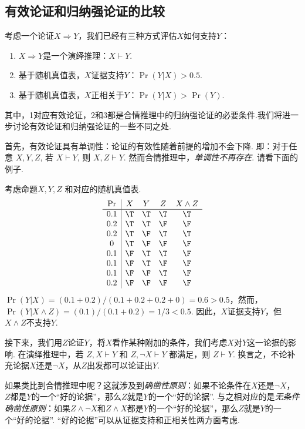 \subsection{有效论证和归纳强论证的比较}

考虑一个论证$X\Rightarrow Y$，我们已经有三种方式评估$X$如何支持$Y$：
    \begin{enumerate}
        \item $X\Rightarrow Y$是一个演绎推理：$X\vdash Y$.
        \item 基于随机真值表，$X$证据支持$Y$：$\Pr(Y|X) > 0.5$.
        \item 基于随机真值表，$X$正相关于$Y$：$\Pr(Y|X) > \Pr(Y)$.
    \end{enumerate}
其中，1对应有效论证，2和3都是合情推理中的归纳强论证的必要条件.我们将进一步讨论有效论证和归纳强论证的一些不同之处.

首先，有效论证具有单调性：论证的有效性随着前提的增加不会下降. 即：对于任意 $X, Y, Z$, 若 $X\vdash Y$, 则 $X,Z\vdash Y$. 然而合情推理中，\emph{单调性不再存在}. 请看下面的例子.

\begin{example}[非单调性：例子]
考虑命题$X, Y, Z$ 和对应的随机真值表.
\[\begin{array}{c|ccccc}
        \Pr & X & Y & Z & X \wedge Z \\ \hline
        0.1 & \T & \T & \T & \T\\
        0.2 & \T & \T & \F & \F\\
        0.2 & \T & \F & \T & \T\\
        0 & \T & \F & \F & \F\\ 
        0.1 & \F & \T & \T & \F\\ 
        0.1 & \F & \T & \F & \F\\
        0.1 & \F & \F & \T & \F\\
        0.2 & \F & \F & \F & \F\\
\end{array}\]
$\Pr(Y|X) = (0.1 + 0.2) / (0.1 + 0.2 + 0.2 + 0) = 0.6 > 0.5$，然而，$\Pr(Y|X \wedge Z) = (0.1) / (0.1 + 0.2) = 1/3 < 0.5$. 因此，$X$证据支持$Y$，但$X\wedge Z$不支持$Y$.
\end{example}

接下来，我们用$Z$论证$Y$，将$X$看作某种附加的条件，我们考虑$X$对$Y$这一论据的影响. 在演绎推理中，若 $Z,X\vdash Y$ 和 $Z,\neg X\vdash Y$ 都满足，则 $Z\vdash Y$. 换言之，不论补充论据$X$还是$\neg X$，从$Z$出发都可以论证出$Y$. 

如果类比到合情推理中呢？这就涉及到\emph{确凿性原则}：如果不论条件在$X$还是$\neg X$，$Z$都是$Y$的一个“好的论据”，那么$Z$就是$Y$的一个“好的论据”. 与之相对应的是\emph{无条件确凿性原则}：如果$Z\wedge\neg X$和$Z\wedge X$都是$Y$的一个“好的论据”，那么$Z$就是$Y$的一个“好的论据”. “好的论据”可以从证据支持和正相关性两方面考虑.

